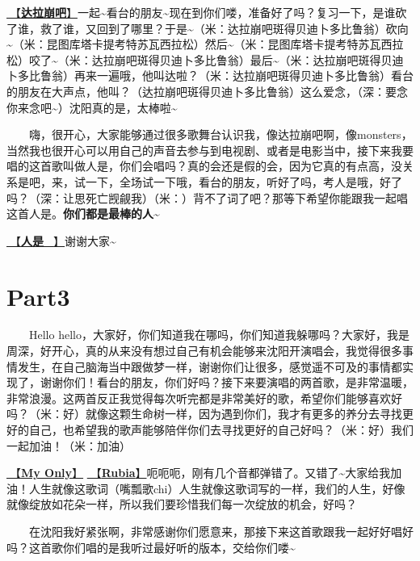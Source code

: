 \documentclass[]{ctexbook}
\begin{document}
\hyperref[dalabengba]{🎵【\textbf{达拉崩吧}】}一起\textasciitilde 看台的朋友\textasciitilde 现在到你们喽，准备好了吗？复习一下，是谁砍了谁，救了谁，又回到了哪里？于是\textasciitilde（米：达拉崩吧斑得贝迪卜多比鲁翁）砍向\textasciitilde（米：昆图库塔卡提考特苏瓦西拉松）然后\textasciitilde（米：昆图库塔卡提考特苏瓦西拉松）咬了\textasciitilde（米：达拉崩吧斑得贝迪卜多比鲁翁）最后\textasciitilde（米：达拉崩吧斑得贝迪卜多比鲁翁）再来一遍哦，他叫达啦？（米：达拉崩吧斑得贝迪卜多比鲁翁）看台的朋友在大声点，他叫？（达拉崩吧斑得贝迪卜多比鲁翁）这么爱念，（深：要念你来念吧\textasciitilde）沈阳真的是，太棒啦\textasciitilde{}

  嗨，很开心，大家能够通过很多歌舞台认识我，像达拉崩吧啊，像monsters，当然我也很开心可以用自己的声音去参与到电视剧、或者是电影当中，接下来我要唱的这首歌叫做人是，你们会唱吗？真的会还是假的会，因为它真的有点高，没关系是吧，来，试一下，全场试一下哦，看台的朋友，听好了吗，考人是哦，好了吗？（深：让思死亡觊觎我）（米：）背不了词了吧？那等下希望你能跟我一起唱这首人是。\textbf{你们都是最棒的人\textasciitilde{}}

\hyperref[renshi]{🎵【\textbf{人是\_}】}谢谢大家\textasciitilde{}

\section{Part3}\label{shenyang-20240907-part3}

  Hello hello，大家好，你们知道我在哪吗，你们知道我躲哪吗？大家好，我是周深，好开心，真的从来没有想过自己有机会能够来沈阳开演唱会，我觉得很多事情发生，在自己脑海当中跟做梦一样，谢谢你们让很多，感觉遥不可及的事情都实现了，谢谢你们！看台的朋友，你们好吗？接下来要演唱的两首歌，是非常温暖，非常浪漫。这两首反正我觉得每次听完都是非常美好的歌，希望你们能够喜欢好吗？（米：好）就像这颗生命树一样，因为遇到你们，我才有更多的养分去寻找更好的自己，也希望我的歌声能够陪伴你们去寻找更好的自己好吗？（米：好）我们一起加油！（米：加油）

\hyperref[my-only]{🎵【\textbf{My Only}】}
\hyperref[rubia]{🎵【\textbf{Rubia}】}呃呃呃，刚有几个音都弹错了。又错了\textasciitilde 大家给我加油！人生就像这歌词（嘴瓢歌chi）人生就像这歌词写的一样，我们的人生，好像就像绽放如花朵一样，所以我们要珍惜我们每一次绽放的机会，好吗？

  在沈阳我好紧张啊，非常感谢你们愿意来，那接下来这首歌跟我一起好好唱好吗？这首歌你们唱的是我听过最好听的版本，交给你们喽\textasciitilde{}
\end{document}
